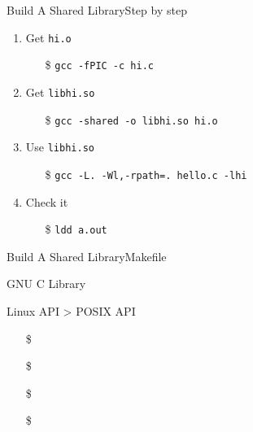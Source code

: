 \begin{frame}{Build A Shared Library}{Step by step}
  \begin{enumerate}
  \item Get \alert{\texttt{hi.o}}
    \begin{itemize}
    \item[\$] \texttt{gcc -fPIC -c hi.c}
    \end{itemize}
  \item Get \alert{\texttt{libhi.so}}
    \begin{itemize}
    \item[\$] \texttt{gcc -shared -o libhi.so hi.o}
    \end{itemize}
  \item Use \alert{\texttt{libhi.so}}
    \begin{itemize}
    \item[\$] \texttt{gcc -L. -Wl,-rpath=. hello.c -lhi}
    \end{itemize}
  \item Check it
    \begin{itemize}
    \item[\$] \texttt{ldd a.out}
    \end{itemize}
  \end{enumerate}
\end{frame}

\begin{frame}{Build A Shared Library}{Makefile}
  \begin{center}
  \end{center}
\end{frame}

\begin{frame}{GNU C Library}
  \begin{minipage}{.55\linewidth}
    Linux API > POSIX API
    \begin{itemize}
    \item[\$] 
    \item[\$] 
    \item[\$] 
    \item[\$] 
    \item[\debian] 
    \end{itemize}
  \end{minipage}
  \begin{minipage}{.4\linewidth}
    \begin{center}
    \end{center}
  \end{minipage}
\end{frame}

